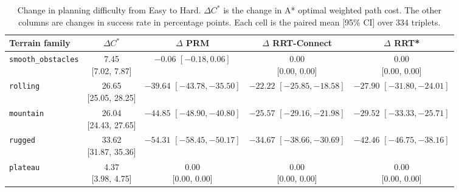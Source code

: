 \documentclass[11pt]{article}
\begin{document}
\begin{table}[htbp]
  \centering
  \caption{Change in planning difficulty from Easy to Hard. $\Delta C^*$ is the
  change in A* optimal weighted path cost. The other columns are changes in
  success rate in percentage points. Each cell is the paired mean [95\% CI]
  over 334 triplets.}
  \label{tab:paired-planning-effects}
  \footnotesize
  \setlength{\tabcolsep}{4pt}
  \renewcommand{\arraystretch}{1.15}
  \begin{tabular}{lcccc}
    \toprule
    Terrain family & $\Delta C^*$ & $\Delta$ PRM & $\Delta$ RRT-Connect & $\Delta$ RRT* \\
    \midrule
    \texttt{smooth\_obstacles} & \shortstack{7.45\\{[7.02, 7.87]}} &
      \shortstack{$-0.06$\\{$[-0.18, 0.06]$}} &
      \shortstack{0.00\\{[0.00, 0.00]}} & \shortstack{0.00\\{[0.00, 0.00]}} \\
    \texttt{rolling} & \shortstack{26.65\\{[25.05, 28.25]}} &
      \shortstack{$-39.64$\\{$[-43.78, -35.50]$}} &
      \shortstack{$-22.22$\\{$[-25.85, -18.58]$}} &
      \shortstack{$-27.90$\\{$[-31.80, -24.01]$}} \\
    \texttt{mountain} & \shortstack{26.04\\{[24.43, 27.65]}} &
      \shortstack{$-44.85$\\{$[-48.90, -40.80]$}} &
      \shortstack{$-25.57$\\{$[-29.16, -21.98]$}} &
      \shortstack{$-29.52$\\{$[-33.33, -25.71]$}} \\
    \texttt{rugged} & \shortstack{33.62\\{[31.87, 35.36]}} &
      \shortstack{$-54.31$\\{$[-58.45, -50.17]$}} &
      \shortstack{$-34.67$\\{$[-38.66, -30.69]$}} &
      \shortstack{$-42.46$\\{$[-46.75, -38.16]$}} \\
    \texttt{plateau} & \shortstack{4.37\\{[3.98, 4.75]}} &
      \shortstack{0.00\\{[0.00, 0.00]}} &
      \shortstack{0.00\\{[0.00, 0.00]}} & \shortstack{0.00\\{[0.00, 0.00]}} \\
    \bottomrule
  \end{tabular}
\end{table}
\end{document}
